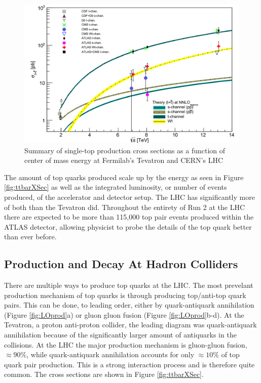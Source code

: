 \begin{figure}[h!]
	\centering
	\includegraphics[width=\columnwidth]{../ThesisImages/Theory/singtprodxsec.png}
	\caption[Summary of single-top production cross sections as a function of center of mass energy at Fermilab's Tevatron and CERN's LHC]{Summary of single-top production cross sections as a function of center of mass energy at Fermilab's Tevatron and CERN's LHC\cite{TopWG}}
	\label{fig:singtXSec}
\end{figure}

 The amount of top quarks produced scale up by the energy as seen in Figure \ref{fig:ttbarXSec} as well as the integrated luminosity, or number of events produced, of the accelerator and detector setup.  The LHC has significantly more of both than the Tevatron did.  Throughout the entirety of Run 2 at the LHC there are expected to be more than 115,000 top pair events produced within the ATLAS detector, allowing physicist to probe the details of the top quark better than ever before.  


\subsection{Production and Decay At Hadron Colliders}

There are multiple ways to produce top quarks at the LHC.  The most prevelant production mechanism of top quarks is through producing top/anti-top quark pairs.  This can be done, to leading order, either by quark-antiquark annihilation (Figure \ref{fig:LOprod}a) or gluon gluon fusion (Figure \ref{fig:LOprod}b-d).  At the Tevatron, a proton anti-proton collider, the leading diagram was quark-antiquark annihilation because of the significantly larger amount of antiquarks in the collisions.  At the LHC the major production mechanism is gluon-gluon fusion, $\approx 90\%$, while quark-antiquark annihilation accounts for only $\approx 10\%$  of top quark pair production.  This is a strong interaction process and is therefore quite common.  The cross sections are shown in Figure \ref{fig:ttbarXSec}.


